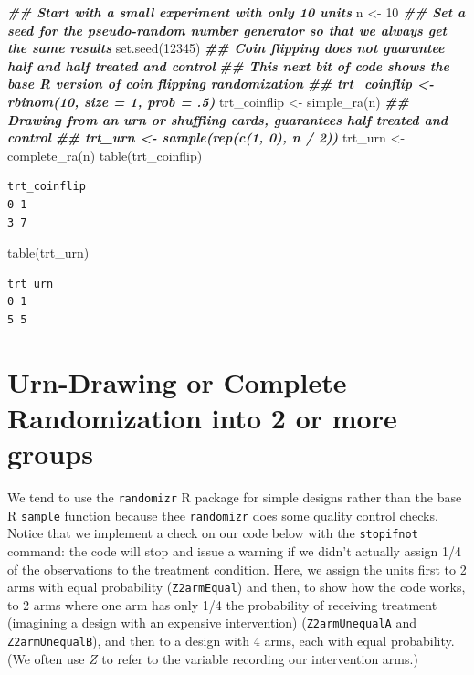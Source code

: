 \documentclass[
  12pt,
]{book}
\newenvironment{Shaded}{\begin{snugshade}}{\end{snugshade}}
\newcommand{\DecValTok}[1]{\textcolor[rgb]{0.00,0.00,0.81}{#1}}
\newcommand{\DocumentationTok}[1]{\textcolor[rgb]{0.56,0.35,0.01}{\textbf{\textit{#1}}}}
\newcommand{\FunctionTok}[1]{\textcolor[rgb]{0.00,0.00,0.00}{#1}}
\newcommand{\NormalTok}[1]{#1}
\newcommand{\OtherTok}[1]{\textcolor[rgb]{0.56,0.35,0.01}{#1}}
\theoremstyle{definition}
\theoremstyle{definition}
\theoremstyle{definition}
\theoremstyle{remark}
\begin{document}
\begin{Shaded}
\begin{Highlighting}[]
\DocumentationTok{\#\# Start with a small experiment with only 10 units}
\NormalTok{n }\OtherTok{\textless{}{-}} \DecValTok{10}
\DocumentationTok{\#\# Set a seed for the pseudo{-}random number generator so that we always get the same results}
\FunctionTok{set.seed}\NormalTok{(}\DecValTok{12345}\NormalTok{)}
\DocumentationTok{\#\# Coin flipping does not guarantee half and half treated and control}
\DocumentationTok{\#\# This next bit of code shows the base R version of coin flipping randomization}
\DocumentationTok{\#\# trt\_coinflip \textless{}{-} rbinom(10, size = 1, prob = .5)}
\NormalTok{trt\_coinflip }\OtherTok{\textless{}{-}} \FunctionTok{simple\_ra}\NormalTok{(n)}
\DocumentationTok{\#\# Drawing from an urn or shuffling cards, guarantees half treated and control}
\DocumentationTok{\#\# trt\_urn \textless{}{-} sample(rep(c(1, 0), n / 2))}
\NormalTok{trt\_urn }\OtherTok{\textless{}{-}} \FunctionTok{complete\_ra}\NormalTok{(n)}
\FunctionTok{table}\NormalTok{(trt\_coinflip)}
\end{Highlighting}
\end{Shaded}

\begin{verbatim}
trt_coinflip
0 1 
3 7 
\end{verbatim}

\begin{Shaded}
\begin{Highlighting}[]
\FunctionTok{table}\NormalTok{(trt\_urn)}
\end{Highlighting}
\end{Shaded}

\begin{verbatim}
trt_urn
0 1 
5 5 
\end{verbatim}

\hypertarget{urn-drawing-or-complete-randomization-into-2-or-more-groups}{%
\section{Urn-Drawing or Complete Randomization into 2 or more
groups}\label{urn-drawing-or-complete-randomization-into-2-or-more-groups}}

We tend to use the \texttt{randomizr} R package \citep{R-randomizr} for
simple designs rather than the base R \texttt{sample} function because
thee \texttt{randomizr} does some quality control checks. Notice that we
implement a check on our code below with the \texttt{stopifnot} command:
the code will stop and issue a warning if we didn't actually assign 1/4
of the observations to the treatment condition. Here, we assign the
units first to 2 arms with equal probability (\texttt{Z2armEqual}) and
then, to show how the code works, to 2 arms where one arm has only 1/4
the probability of receiving treatment (imagining a design with an
expensive intervention) (\texttt{Z2armUnequalA} and
\texttt{Z2armUnequalB}), and then to a design with 4 arms, each with
equal probability. (We often use \(Z\) to refer to the variable
recording our intervention arms.)
\end{document}
